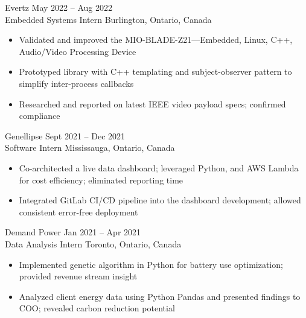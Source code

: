 \documentclass{article}
\begin{document}
Evertz \hfill May 2022 – Aug 2022 \\
Embedded Systems Intern \hfill Burlington, Ontario, Canada
\begin{itemize}
	\item Validated and improved the MIO-BLADE-Z21—Embedded, Linux, C++, Audio/Video Processing Device
	\item Prototyped library with C++ templating and subject-observer pattern to simplify inter-process callbacks
	\item Researched and reported on latest IEEE video payload specs; confirmed compliance
\end{itemize}

Genellipse \hfill Sept 2021 – Dec 2021 \\
Software Intern \hfill Mississauga, Ontario, Canada
\begin{itemize}
	\item Co-architected a live data dashboard; leveraged Python, and AWS Lambda for cost efficiency; eliminated reporting time
	\item Integrated GitLab CI/CD pipeline into the dashboard development; allowed consistent error-free deployment
\end{itemize}

Demand Power \hfill Jan 2021 – Apr 2021 \\
Data Analysis Intern \hfill Toronto, Ontario, Canada
\begin{itemize}
\item Implemented genetic algorithm in Python for battery use optimization; provided revenue stream insight
\item Analyzed client energy data using Python Pandas and presented findings to COO; revealed carbon reduction potential
\end{itemize}
\end{document}
